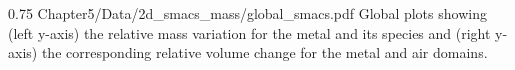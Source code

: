 \begin{figureth}
{0.75}
{Chapter5/Data/2d_smacs_mass/global_smacs.pdf}
{Global plots showing (left y-axis) the relative mass variation for the metal and its species and (right y-axis) the corresponding relative volume change for the metal and air domains.}
\label{fig:smacs_mass_volume}
\end{figureth}




  
  






